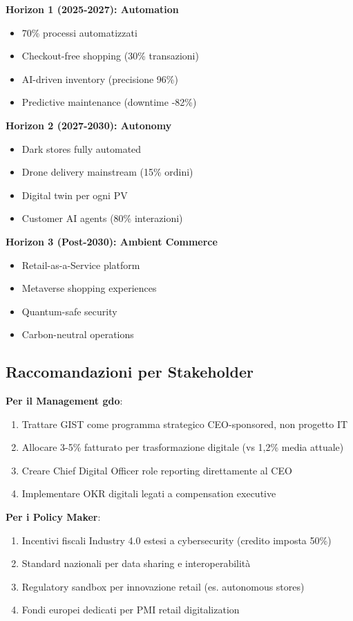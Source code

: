 \textbf{Horizon 1 (2025-2027): Automation}
\begin{itemize}
\item 70\% processi automatizzati
\item Checkout-free shopping (30\% transazioni)
\item AI-driven inventory (precisione 96\%)
\item Predictive maintenance (downtime -82\%)
\end{itemize}

\textbf{Horizon 2 (2027-2030): Autonomy}
\begin{itemize}
\item Dark stores fully automated
\item Drone delivery mainstream (15\% ordini)
\item Digital twin per ogni PV
\item Customer AI agents (80\% interazioni)
\end{itemize}

\textbf{Horizon 3 (Post-2030): Ambient Commerce}
\begin{itemize}
\item Retail-as-a-Service platform
\item Metaverse shopping experiences
\item Quantum-safe security
\item Carbon-neutral operations
\end{itemize}

\subsection{\texorpdfstring{Raccomandazioni per Stakeholder}{5.5.3 - Raccomandazioni}}
\label{subsec:5.5.3}

\textbf{Per il Management \gls{gdo}}:
\begin{enumerate}
\item Trattare GIST come programma strategico CEO-sponsored, non progetto IT
\item Allocare 3-5\% fatturato per trasformazione digitale (vs 1,2\% media attuale)
\item Creare Chief Digital Officer role reporting direttamente al CEO
\item Implementare OKR digitali legati a compensation executive
\end{enumerate}

\textbf{Per i Policy Maker}:
\begin{enumerate}
\item Incentivi fiscali Industry 4.0 estesi a cybersecurity (credito imposta 50\%)
\item Standard nazionali per data sharing e interoperabilità
\item Regulatory sandbox per innovazione retail (es. autonomous stores)
\item Fondi europei dedicati per PMI retail digitalization
\end{enumerate}

